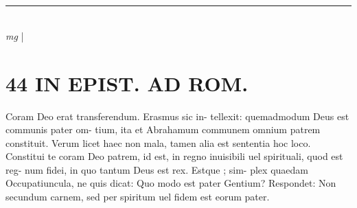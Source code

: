 \documentclass{article}
\begin{document}
\begin{pages}
\section*{}\pstart  \pend\pstart  \pend\pstart  \pend\pstart  \pend\pstart  \pend
{}
{}
\subsection*{\textit{}}
{}
\subsection*{\textit{}}
{}
\subsection*{\textit{}}
{}
\subsection*{\textit{}}
{}
\subsection*{\textit{}}
\vspace{0.5cm}\noindent
\vspace{0.2cm}\rule{1cm}{0.2pt}\\ 
\hspace{0.2cm}\textit{mg}
\footnotesize 
\normalsize| 
\section*{44 IN EPIST. AD ROM.  }
\marginpar{[ p.]}\pstart Coram Deo erat transferendum. Erasmus sic in- tellexit: quemadmodum Deus est communis pater om- tium, ita et Abrahamum communem omnium patrem constituit. Verum licet haec non mala, tamen alia est sententia hoc loco. Constitui te coram Deo patrem, id est, in regno inuisibili uel spirituali, quod est reg- num fidei, in quo tantum Deus est rex. Estque ; sim- plex quaedam Occupatiuncula, ne quis dicat: Quo modo est pater Gentium? Respondet: Non secundum carnem, sed per spiritum uel fidem est eorum pater.   \pend
{}
{}

\end{pages}
\end{document}
